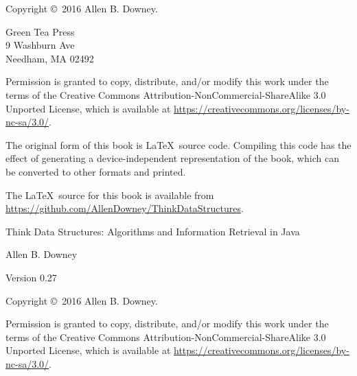 \documentclass[12pt]{book}
\newcommand{\thetitle}{Think Data Structures}
\newcommand{\thesubtitle}{Algorithms and Information Retrieval in Java}
\newcommand{\theauthors}{Allen B. Downey}
\newcommand{\theversion}{0.27}
\theoremstyle{exercise}
\begin{document}
\begin{latexonly}
\newpage
\thispagestyle{empty}

Copyright \copyright ~2016 \theauthors.

\vspace{0.2in}

\begin{flushleft}
Green Tea Press \\
9 Washburn Ave \\
Needham, MA 02492
\end{flushleft}

Permission is granted to copy, distribute, and/or modify this work
under the terms of the Creative Commons
Attribution-NonCommercial-ShareAlike 3.0 Unported License, which is
available at \url{https://creativecommons.org/licenses/by-nc-sa/3.0/}.

The original form of this book is \LaTeX\ source code.  Compiling this
code has the effect of generating a device-independent representation
of the book, which can be converted to other formats and printed.

The \LaTeX\ source for this book is available from
\url{https://github.com/AllenDowney/ThinkDataStructures}.


\cleardoublepage
\setcounter{tocdepth}{1}
\tableofcontents

\end{latexonly}


\begin{htmlonly}

\vspace{1em}

{\Large \thetitle: \thesubtitle}

{\large \theauthors}

Version \theversion

\vspace{1em}

Copyright \copyright ~2016 \theauthors.

Permission is granted to copy, distribute, and/or modify this work under the terms of the Creative Commons Attribution-NonCommercial-ShareAlike 3.0 Unported License, which is available at \url{https://creativecommons.org/licenses/by-nc-sa/3.0/}.

\vspace{1em}

\end{htmlonly}
\end{document}
